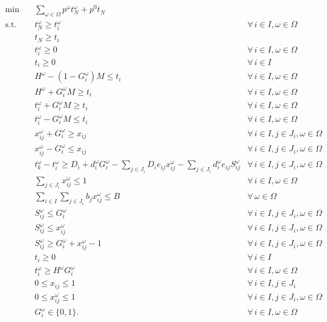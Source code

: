 \documentclass[11pt]{article}
\begin{document}
	\begin{subequations} \label{prob2:extensive}
		\begin{align}
		\min \quad & \sum_{\omega \in \Omega} p^\omega t_N^\omega + p^0 t_N& \\
		\text{s.t.} \quad & t_N^\omega \geq t_i^\omega & \forall \,i \in I, \omega \in \Omega \\
		& t_N \geq t_i & \label{cons:tN}\\
		& t_i^\omega \geq 0 & \forall \,i \in I, \omega \in \Omega\\
		& t_i \geq 0 & \forall \,i \in I\\
		& H^\omega - (1 - G_i^\omega) M \leq t_i & \forall \,i \in I, \omega \in \Omega \label{cons:F}\\
		& H^\omega + G_i^\omega M \geq t_i & \forall \,i \in I, \omega \in \Omega \label{cons:G}\\
		& t_i^\omega + G_i^\omega M \geq t_i & \forall \,i \in I, \omega \in \Omega \label{cons:tf1}\\
		& t_i^\omega - G_i^\omega M \leq t_i & \forall \,i \in I, \omega \in \Omega \label{cons:tf2}\\
		& x_{ij}^\omega + G_i^\omega \geq x_{ij} & \forall \,i \in I, j \in J_i, \omega \in \Omega \label{cons:xf1}\\
		& x_{ij}^\omega - G_i^\omega \leq x_{ij} & \forall \,i \in I, j \in J_i, \omega \in \Omega \label{cons:xf2}\\
		& t_k^\omega - t_i^\omega \geq D_i + d_i^\omega G_i^\omega -\sum_{j \in J_i} D_i e_{ij} x_{ij}^\omega - \sum_{j \in J_i} d_i^\omega e_{ij} S_{ij}^\omega & \forall \,i \in I, j \in J_i, \omega \in \Omega \label{cons:duration}\\
		& \sum_{j \in J_i} x_{ij}^\omega \leq 1 & \forall \,i \in I, \omega \in \Omega \label{cons:crashLim}\\
		& \sum_{i \in I}\sum_{j \in J_i} b_jx_{ij}^\omega \leq B & \forall \,\omega \in \Omega \label{cons:budget}\\
		& S_{ij}^\omega \leq G_i^\omega & \forall \,i \in I, j \in J_i, \omega \in \Omega \label{cons:linearize1}\\
		& S_{ij}^\omega \leq x_{ij}^\omega & \forall \,i \in I, j \in J_i, \omega \in \Omega \label{cons:linearize2}\\
		& S_{ij}^\omega \geq G_i^\omega + x_{ij}^\omega - 1 & \forall \,i \in I, j \in J_i, \omega \in \Omega \label{cons:linearize3}\\
		& t_i \geq 0 & \forall\,i \in I \\
		& t_i^\omega \geq H^\omega G_i^\omega & \forall\, i \in I, \omega \in \Omega \\
		& 0 \leq x_{ij} \leq 1 & \forall \,i \in I, j \in J_i\\ 
		& 0 \leq x_{ij}^\omega \leq 1 & \forall \,i \in I, j \in J_i, \omega \in \Omega\\
		& G_i^\omega \in \{0,1\}. & \forall \,i \in I, \omega \in \Omega
		\end{align}
	\end{subequations}
\end{document}
